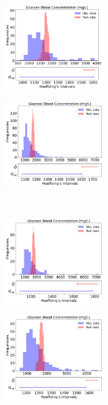 \begin{figure}[t]
\begin{subfigure}[b]{0.26\textwidth}
    \label{fig:chlorideb}
    \end{subfigure}\\
    \begin{subfigure}[b]{0.26\textwidth}
    \includegraphics[height=3.7cm]{figures/causal/latest_experimental_results/Glucose_hyp_46_with_hoeff_onesided_loFalse_nogray.pdf}
    \label{fig:potassiuma}
    \end{subfigure}\hspace{1cm}%
    \begin{subfigure}[b]{0.26\textwidth}
    \includegraphics[height=3.7cm]{figures/causal/latest_experimental_results/Glucose_hyp_7_with_hoeff_onesided_loFalse_nogray.pdf}
    \label{fig:potassiumb}
    \end{subfigure}\\
    \begin{subfigure}[b]{0.26\textwidth}
    \includegraphics[height=3.7cm]{figures/causal/latest_experimental_results/Glucose_hyp_47_with_hoeff_onesided_loFalse_nogray.pdf}
    \label{fig:paco2a}
    \end{subfigure}\hspace{1cm}%
    \begin{subfigure}[b]{0.26\textwidth}
    \includegraphics[height=3.7cm]{figures/causal/latest_experimental_results/Glucose_hyp_10_with_hoeff_onesided_loFalse_nogray.pdf}

\end{subfigure}
\end{figure}
